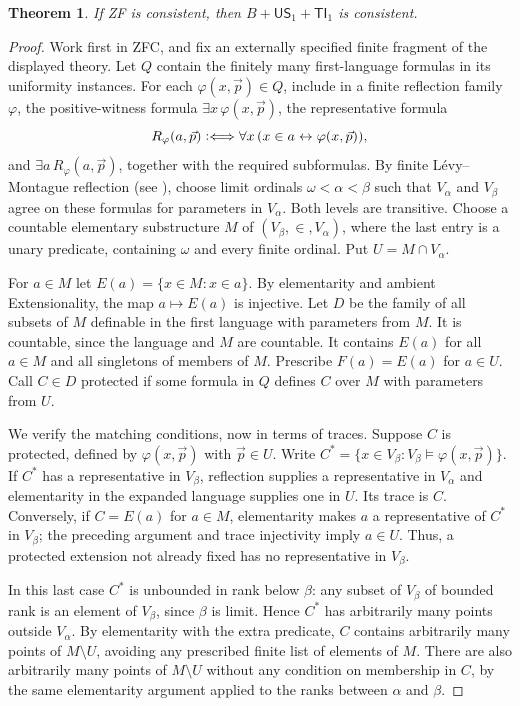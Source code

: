 \documentclass[11pt,a4paper]{article}
\numberwithin{equation}{section}
\newtheorem{theorem}{Theorem}[section]
\theoremstyle{definition}
\theoremstyle{remark}
\newcommand{\TI}{\mathsf{TI}_1}
\newcommand{\US}{\mathsf{US}_1}
\newcommand{\defiff}{\mathrel{\vcentcolon\Longleftrightarrow}}
\begin{document}
\begin{theorem}\label{thm:rank}
If ZF is consistent, then $B+\US+\TI$ is consistent.
\end{theorem}
\begin{proof}
Work first in ZFC, and fix an externally specified finite fragment of the displayed theory. Let $Q$ contain the finitely many first-language formulas in its uniformity instances. For each $\varphi(x,\vec p)\in Q$, include in a finite reflection family $\varphi$, the positive-witness formula $\exists x\,\varphi(x,\vec p)$, the representative formula
\[R_\varphi(a,\vec p)\defiff \forall x\,(x\in a\leftrightarrow\varphi(x,\vec p)),\]
and $\exists a\,R_\varphi(a,\vec p)$, together with the required subformulas. By finite L\'evy--Montague reflection (see \cite{jech}), choose limit ordinals $\omega<\alpha<\beta$ such that $V_\alpha$ and $V_\beta$ agree on these formulas for parameters in $V_\alpha$. Both levels are transitive. Choose a countable elementary substructure $M$ of $(V_\beta,\in,V_\alpha)$, where the last entry is a unary predicate, containing $\omega$ and every finite ordinal. Put $U=M\cap V_\alpha$.

For $a\in M$ let $E(a)=\{x\in M:x\in a\}$. By elementarity and ambient Extensionality, the map $a\mapsto E(a)$ is injective. Let $D$ be the family of all subsets of $M$ definable in the first language with parameters from $M$. It is countable, since the language and $M$ are countable. It contains $E(a)$ for all $a\in M$ and all singletons of members of $M$. Prescribe $F(a)=E(a)$ for $a\in U$. Call $C\in D$ protected if some formula in $Q$ defines $C$ over $M$ with parameters from $U$.

We verify the matching conditions, now in terms of traces. Suppose $C$ is protected, defined by $\varphi(x,\vec p)$ with $\vec p\in U$. Write $C^*=\{x\in V_\beta:V_\beta\models\varphi(x,\vec p)\}$. If $C^*$ has a representative in $V_\beta$, reflection supplies a representative in $V_\alpha$ and elementarity in the expanded language supplies one in $U$. Its trace is $C$. Conversely, if $C=E(a)$ for $a\in M$, elementarity makes $a$ a representative of $C^*$ in $V_\beta$; the preceding argument and trace injectivity imply $a\in U$. Thus, a protected extension not already fixed has no representative in $V_\beta$.

In this last case $C^*$ is unbounded in rank below $\beta$: any subset of $V_\beta$ of bounded rank is an element of $V_\beta$, since $\beta$ is limit. Hence $C^*$ has arbitrarily many points outside $V_\alpha$. By elementarity with the extra predicate, $C$ contains arbitrarily many points of $M\setminus U$, avoiding any prescribed finite list of elements of $M$. There are also arbitrarily many points of $M\setminus U$ without any condition on membership in $C$, by the same elementarity argument applied to the ranks between $\alpha$ and $\beta$.


\end{proof}
\end{document}
